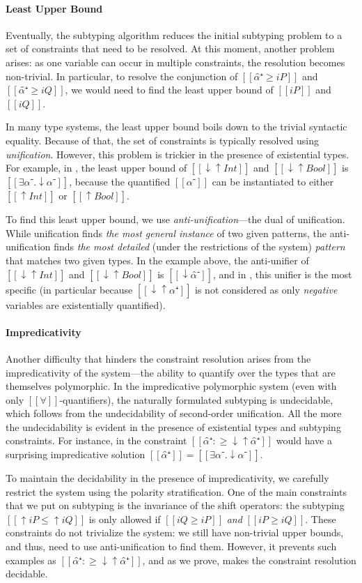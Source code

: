\paragraph{Least Upper Bound}
Eventually, the subtyping algorithm reduces the initial subtyping problem to a set of
constraints that need to be resolved. At this moment, another problem arises:
as one variable can occur in multiple constraints, the resolution becomes non-trivial.
In particular, to resolve the conjunction of $[[α̂⁺ ≥ iP]]$ and $[[α̂⁺ ≥ iQ]]$,
we would need to find the least upper bound of $[[iP]]$ and $[[iQ]]$.

In many type systems, the least upper bound boils down to the trivial syntactic equality.
Because of that, the set of constraints is typically resolved using \emph{unification}.
However, this problem is trickier in the presence of existential types. For example, 
in \fexists, the least upper bound of $[[↓↑Int]]$ and $[[↓↑Bool]]$ is $[[∃α⁻.↓α⁻]]$,
because the quantified $[[α⁻]]$ can be instantiated to either $[[↑Int]]$ or $[[↑Bool]]$.

To find this least upper bound, we use \emph{anti-unification}---the dual of
unification. While unification finds \emph{the most general instance} of two
given patterns, the anti-unification finds \emph{the most detailed} (under the
restrictions of the system) \emph{pattern} that matches two given types. In the
example above, the anti-unifier of $[[↓↑Int]]$ and $[[↓↑Bool]]$ is $[[↓α̂⁻]]$,
and in \fexists, this unifier is the most specific (in particular because
$[[↓↑α̂⁺]]$ is not considered as only \emph{negative} variables are
existentially quantified).

\paragraph{Impredicativity}
Another difficulty that hinders the constraint resolution arises from the
impredicativity of the system---the ability to quantify over the types that are 
themselves polymorphic. In the impredicative polymorphic system (even
with only $[[∀]]$-quantifiers), the naturally formulated subtyping is
undecidable, which follows from the undecidability of second-order unification.
All the more the undecidability is evident in the presence of existential types
and subtyping constraints. For instance, in \fexists the constraint 
$[[α̂⁺ :≥ ↓↑α̂⁺]]$ would have a surprising impredicative solution $[[α̂⁺]] = [[∃α⁻.↓α⁻]]$. 

To maintain the decidability in the presence of impredicativity, we carefully
restrict the system using the polarity stratification. One of the main
constraints that we put on subtyping is the invariance of the shift operators:
the subtyping $[[↑iP ≤ ↑iQ]]$ is only allowed if $[[iQ ≥ iP]]$
\emph{and} $[[iP ≥ iQ]]$. These constraints do not trivialize the system: we
still have non-trivial upper bounds, and thus, need to use anti-unification to
find them. However, it prevents such examples as $[[α̂⁺ :≥ ↓↑α̂⁺]]$, and 
as we prove, makes the constraint resolution decidable.

